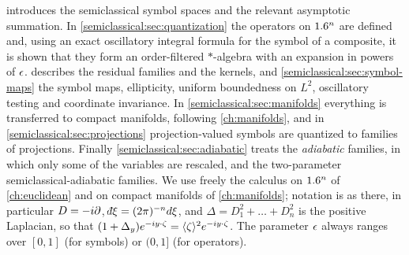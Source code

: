  introduces the semiclassical symbol spaces
and the relevant asymptotic summation. In
\cref{semiclassical:sec:quantization} the operators on $1.6^n$ are defined and,
using an exact oscillatory integral formula for the symbol of a composite, it
is shown that they form an order-filtered $*$-algebra with an expansion in
powers of $\epsilon$.  describes the residual
families and the kernels, and \cref{semiclassical:sec:symbol-maps} the symbol
maps, ellipticity, uniform boundedness on $L^2$, oscillatory testing and
coordinate invariance. In \cref{semiclassical:sec:manifolds} everything is
transferred to compact manifolds, following \cref{ch:manifolds}, and in
\cref{semiclassical:sec:projections} projection-valued symbols are quantized to
families of projections. Finally \cref{semiclassical:sec:adiabatic} treats the
\emph{adiabatic} families, in which only some of the variables are rescaled,
and the two-parameter semiclassical-adiabatic families. We use freely the
calculus on $1.6^n$ of \cref{ch:euclidean} and on compact manifolds of
\cref{ch:manifolds}; notation is as there, in particular $D=-i\partial$,
$\dbar\xi=(2\pi)^{-n}d\xi$, and $\Delta=D_1^2+\dots+D_n^2$ is the positive
Laplacian, so that $(1+\Delta_y)e^{-iy\cdot\zeta}=\langle \zeta\rangle^2e^{-iy\cdot\zeta}$.
The parameter $\epsilon$ always ranges over $[0,1]$ (for symbols) or $(0,1]$ (for
operators).

